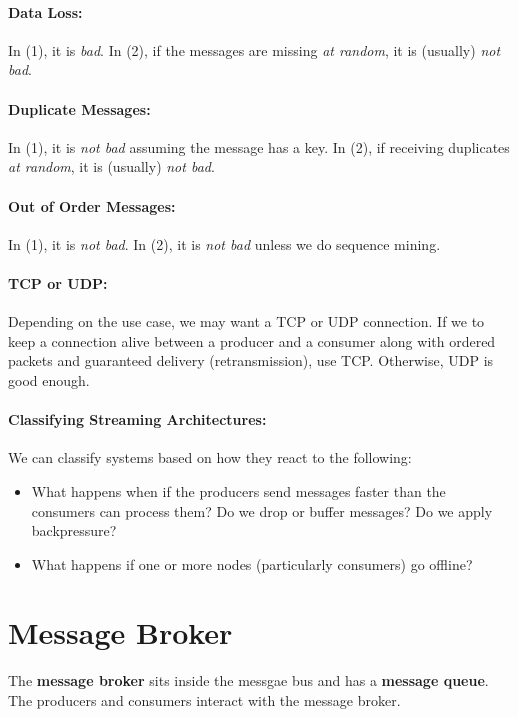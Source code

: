 \documentclass{report}
\newenvironment{definition}[1]{\begin{tcolorbox}[title={Definition: #1}]}{\end{tcolorbox}}
\renewcommand{\bf}[1]{\textbf{{#1}}}
\renewcommand{\it}[1]{\textit{{#1}}}
\begin{document}
\paragraph{Data Loss:} In (1), it is \it{bad}. In (2), if the messages are
missing \it{at random}, it is (usually) \it{not bad}.

\paragraph{Duplicate Messages:} In (1), it is \it{not bad} assuming the message
has a key. In (2), if receiving duplicates \it{at random}, it is (usually)
\it{not bad}.

\paragraph{Out of Order Messages:} In (1), it is \it{not bad}. In (2), it is
\it{not bad} unless we do sequence mining.

\paragraph{TCP or UDP:} Depending on the use case, we may want a TCP or UDP
connection. If we to keep a connection alive between a producer and a consumer
along with ordered packets and guaranteed delivery (retransmission), use TCP.
Otherwise, UDP is good enough.

\paragraph{Classifying Streaming Architectures:}
We can classify systems based on how they react to the following:
\begin{itemize}[label=$\to$]
    \item What happens when if the producers send messages faster than the
        consumers can process them? Do we drop or buffer messages? Do we apply
        backpressure?
    \item What happens if one or more nodes (particularly consumers) go offline?
\end{itemize}

\section{Message Broker}
\begin{definition}{Message Broker}
    The \bf{message broker} sits inside the messgae bus and has a \bf{message queue}.
    The producers and consumers interact with the message broker.
\end{definition}
\end{document}
